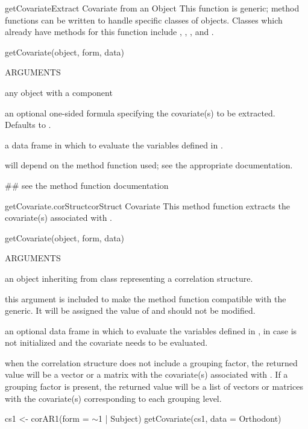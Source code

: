 \documentclass[pdftex]{article} \usepackage{url,graphicx}
\renewcommand{\Twiddle}{\mbox{\(\sim\)}}
\begin{document}
\begin{Helpfile}{getCovariate}{Extract Covariate from an Object}
This function is generic; method functions can be written to handle
specific classes of objects. Classes which already have methods for
this function include , ,
, and .
\begin{Example}
getCovariate(object, form, data)
\end{Example}
\begin{Argument}{ARGUMENTS}
\item[\Co{object:}]
any object with a  component
\item[\Co{form:}]
an optional one-sided formula specifying the covariate(s)
to be extracted. Defaults to .
\item[\Co{data:}]
a data frame in which to evaluate the variables defined in
. 
\end{Argument}
will depend on the method function used; see the appropriate documentation.
\need 15pt
\vspace{-16pt} 
\begin{Example}
## see the method function documentation
\end{Example}
\end{Helpfile}
\begin{Helpfile}{getCovariate.corStruct}{corStruct Covariate}
This method function extracts the covariate(s) associated with
.
\begin{Example}
getCovariate(object, form, data)
\end{Example}
\begin{Argument}{ARGUMENTS}
\item[\Co{object:}]
an object inheriting from class 
representing a correlation structure.
\item[\Co{form:}]
this argument is included to make the method function
compatible with the generic. It will be assigned the value of
 and should not be modified.
\item[\Co{data:}]
an optional data frame in which to evaluate the variables
defined in , in case  is not initialized and
the covariate needs to be evaluated.
\end{Argument}
when the correlation structure does not include a grouping factor, the
returned value will be a vector or a matrix with the covariate(s)
associated with . If a grouping factor is present, the
returned value will be a list of vectors or matrices with the
covariate(s) corresponding to each grouping level.
\need 15pt
\vspace{-16pt} 
\begin{Example}
cs1 <- corAR1(form = \Twiddle 1 | Subject)
getCovariate(cs1, data = Orthodont)
\end{Example}
\end{Helpfile}
\end{document}
